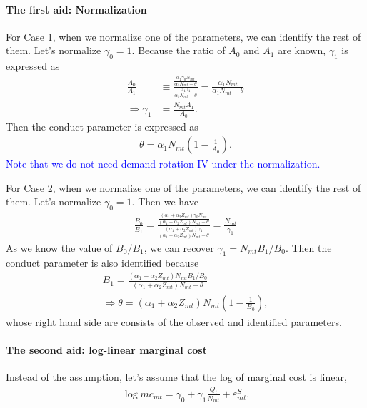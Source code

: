 \documentclass[11pt]{article}
\begin{document}
\paragraph{The first aid: Normalization}

For Case 1, when we normalize one of the parameters, we can identify the rest of them. Let's normalize $\gamma_0 = 1$. Because the ratio of $A_0$ and $A_1$ are known, $\gamma_1$ is expressed as 
    \begin{align*}
        \frac{A_0}{A_1} &\equiv  \frac{\frac{\alpha_1 \gamma_0 N_{mt}}{\alpha_1 N_{mt}-\theta}}{\frac{\alpha_1 \gamma_1}{\alpha_1 N_{mt}-\theta}} = \frac{\alpha_1 N_{mt}}{\alpha_1 N_{mt}-\theta}\\
        \Longrightarrow \gamma_1 &= \frac{N_{mt}A_1}{A_0}.
    \end{align*}
    Then the conduct parameter is expressed as 
    \begin{align*}
        \theta = \alpha_1 N_{mt} \left(1 - \frac{1}{A_0}\right).
    \end{align*}
    \textcolor{blue}{Note that we do not need demand rotation IV under the normalization.}

For Case 2, when we normalize one of the parameters, we can identify the rest of them. Let's normalize $\gamma_0 = 1$.  Then we have 
    \begin{align*}
    \frac{B_0}{B_1} = \frac{\frac{(\alpha_1+\alpha_2 Z_{mt}) \gamma_0 N_{mt}}{(\alpha_1+\alpha_2 Z_{mt}) N_{mt}-\theta}}{\frac{(\alpha_1+\alpha_2 Z_{mt}) \gamma_1}{(\alpha_1+\alpha_2 Z_{mt}) N_{mt}-\theta}} = \frac{N_{mt}}{\gamma_1}
    \end{align*}
    As we know the value of $B_0/B_1$, we can recover $\gamma_1 = N_{mt}B_1/B_0$. Then the conduct parameter is also identified because \begin{align*}
        B_1 = \frac{(\alpha_1+\alpha_2 Z_{mt})N_{mt}B_1/B_0 }{(\alpha_1+\alpha_2 Z_{mt}) N_{mt}-\theta}\\
        \Longrightarrow \theta = (\alpha_1+\alpha_2 Z_{mt})N_{mt}\left(1 -\frac{1}{B_0}\right),
    \end{align*}
    whose right hand side are consists of the observed and identified parameters.


\paragraph{The second aid: log-linear marginal cost}

Instead of the assumption, let's assume that the log of marginal cost is linear, 
\begin{align*}
\log mc_{mt} = \gamma_0 + \gamma_1 \frac{Q_t}{N_{mt}} +\varepsilon_{mt}^{S}.
\end{align*}
\end{document}
